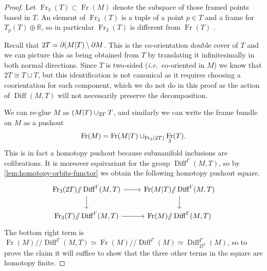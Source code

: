 \documentclass{amsart}
\theoremstyle{plain}
\theoremstyle{definition}
\DeclareMathOperator\Diff{Diff}
\DeclareMathOperator\Fr{Fr}
\newcommand{\ca}{\smash{\mid}} %
\newcommand{\hq}{/\!\!/} %
\newcommand{\bbR}{\mathbb{R}}
\begin{document}
\begin{proof}
    Let $\Fr_3(T) \subset \Fr(M)$ denote the subspace of those framed points based in $T$.
    An element of $\Fr_3(T)$ is a tuple of a point $p \in T$ and a frame for $T_p(T) \oplus \bbR$, so in particular $\Fr_3(T)$ is different from $\Fr(T)$ .

    Recall that $2T = \partial (M \ca T) \setminus \partial M$.
    This is the co-orientation double cover of $T$ and
    we can picture this as being obtained from $T$ by translating it infinitesimally in both normal directions.
    Since $T$ is two-sided (\emph{i.e.}~co-oriented in $M$) we know that $2T \cong T \sqcup T$, but this identification is not canonical as it requires choosing a coorientation for each component, which we do not do in this proof as the action of $\Diff(M,T)$ will not necessarily preserve the decomposition.

    We can re-glue $M$ as $(M\ca T) \cup_{2T} T$, and similarly we can write the frame bundle on $M$ as a pushout 
    \[
        \Fr(M) = \Fr(M \ca T) \cup_{\Fr_3(2T)} \Fr_3(T).
    \]
    This is in fact a homotopy pushout because submanifold inclusions are cofibrations.
    It is moreover equivariant for the group $\Diff^\Gamma(M, T)$, so by \cref{lem:homotopy-orbits-functor} we obtain the following homotopy pushout square.
    \[\begin{tikzcd}
        \Fr_3(2T)\hq \Diff^\Gamma(M, T) \ar[r] \ar[d] & 
        \Fr(M \ca T)\hq \Diff^\Gamma(M, T) \ar[d] \\
        \Fr_3(T)\hq \Diff^\Gamma(M, T) \ar[r] & 
        \Fr(M)\hq \Diff^\Gamma(M, T)
    \end{tikzcd}\]
    The bottom right term is $\Fr(M) \hq \Diff^\Gamma(M, T) \simeq \Fr(M) \hq \Diff^\Gamma(M) \simeq \Diff_{D^3}^\Gamma(M)$, so to prove the claim it will suffice to show that the three other terms in the square are homotopy finite.


\end{proof}
\end{document}
